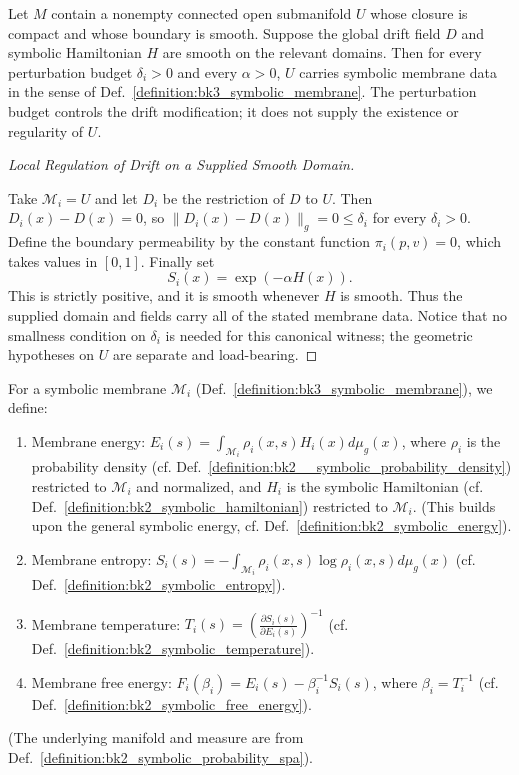 \begin{lemma}
\label{lemma:bk3_wellposedness_of_symbolic_membranes}
Let $M$ contain a nonempty connected open submanifold $U$ whose closure is
compact and whose boundary is smooth.  Suppose the global drift field $D$ and
symbolic Hamiltonian $H$ are smooth on the relevant domains.  Then for every
perturbation budget $\delta_i>0$ and every $\alpha>0$, $U$ carries symbolic
membrane data in the sense of Def.~\ref{definition:bk3_symbolic_membrane}.
The perturbation budget controls the drift modification; it does not supply the
existence or regularity of $U$.
\end{lemma}

\begin{proof}[Local Regulation of Drift on a Supplied Smooth Domain]
\label{proof:bk3_local_regulation_smooth_membranes}
\leavevmode

Take $\mathcal{M}_i=U$ and let $D_i$ be the restriction of $D$ to $U$.
Then $D_i(x)-D(x)=0$, so
$\|D_i(x)-D(x)\|_g=0\leq\delta_i$ for every $\delta_i>0$.  Define the
boundary permeability by the constant function $\pi_i(p,v)=0$, which takes
values in $[0,1]$.  Finally set
\begin{equation}
S_i(x)=\exp(-\alpha H(x)).
\end{equation}
This is strictly positive, and it is smooth whenever $H$ is smooth.  Thus the
supplied domain and fields carry all of the stated membrane data.  Notice that
no smallness condition on $\delta_i$ is needed for this canonical witness; the
geometric hypotheses on $U$ are separate and load-bearing.
\end{proof}

\begin{definition} \label{definition:bk3_membrane_thermodynamics}
For a symbolic membrane $\mathcal{M}_i$ (Def.~\ref{definition:bk3_symbolic_membrane}), we define:
\begin{enumerate}
    \item Membrane energy: $E_i(s) = \int_{\mathcal{M}_i} \rho_i(x,s)H_i(x)d\mu_g(x)$, where $\rho_i$ is the probability density (cf. Def.~\ref{definition:bk2__symbolic_probability_density}) restricted to $\mathcal{M}_i$ and normalized, and $H_i$ is the symbolic Hamiltonian (cf. Def.~\ref{definition:bk2_symbolic_hamiltonian}) restricted to $\mathcal{M}_i$. (This builds upon the general symbolic energy, cf. Def.~\ref{definition:bk2_symbolic_energy}).
    \item Membrane entropy: $S_i(s) = -\int_{\mathcal{M}_i} \rho_i(x,s)\log\rho_i(x,s)d\mu_g(x)$ (cf. Def.~\ref{definition:bk2_symbolic_entropy}).
    \item Membrane temperature: $T_i(s) = \left(\frac{\partial S_i(s)}{\partial E_i(s)}\right)^{-1}$ (cf. Def.~\ref{definition:bk2_symbolic_temperature}).
    \item Membrane free energy: $F_i(\beta_i) = E_i(s) - \beta_i^{-1}S_i(s)$, where $\beta_i = T_i^{-1}$ (cf. Def.~\ref{definition:bk2_symbolic_free_energy}).
\end{enumerate}
(The underlying manifold and measure are from Def.~\ref{definition:bk2_symbolic_probability_spa}).
\end{definition}

